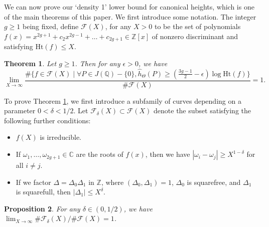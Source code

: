 \documentclass{article} %
\newtheorem{proposition}{Proposition}[section]
\newtheorem{theorem}[proposition]{Theorem}
\numberwithin{equation}{section}
\newcommand{\Q}{\mathbb{Q}}
\newcommand{\bC}{\mathbb{C}}
\newcommand{\Z}{\mathbb{Z}}
\newcommand{\height}{\mathrm{Ht}}
\begin{document}
We can now prove our `density 1' lower bound for canonical heights, which is one of the main theorems of this paper. We first introduce some notation. The integer $g \geq 1$ being fixed, define $\mathcal{F}(X)$, for any $X > 0$ to be the set of polynomials $f(x) = x^{2g+1} + c_2 x^{2g-1} + \dots + c_{2g+1} \in \Z[x]$ of nonzero discriminant and satisfying $\height(f) \leq X$. 
\begin{theorem}\label{thm_density_1_lower_bound_for_canonical_height}
    Let $g \geq 1$. Then for any $\epsilon > 0$, we have
    \[ \lim_{X \to \infty} \frac{\# \{ f \in \mathcal{F}(X) \mid \forall P \in J(\Q) - \{ 0 \}, \widehat{h}_\Theta(P) \geq ( \frac{3g-1}{2} - \epsilon ) \log \height(f) \}}{ \# \mathcal{F}(X)} = 1. \]
\end{theorem}
To prove Theorem \ref{thm_density_1_lower_bound_for_canonical_height}, we first introduce a subfamily of curves depending on a parameter $0< \delta <1/2$. Let $\mathcal{F}_\delta(X) \subset \mathcal{F}(X)$ denote the subset satisfying the following further conditions: 
\begin{itemize}
    \item $f(X)$ is irreducible.
    \item If $\omega_1, \dots, \omega_{2g+1} \in \bC$ are the roots of $f(x)$, then we have $|\omega_i - \omega_j| \geq X^{1-\delta}$ for all $i \neq j$. 
    \item If we factor $\Delta = \Delta_0 \Delta_1$ in $\Z$, where $(\Delta_0, \Delta_1) = 1$, $\Delta_0$ is squarefree, and $\Delta_1$ is squarefull, then $|\Delta_1| \leq X^\delta$.
\end{itemize}
\begin{proposition}\label{prop_good_family_has_density_1}
    For any $\delta \in (0,1/2)$, we have $\lim_{X \to \infty} \# \mathcal{F}_\delta(X) / \# \mathcal{F}(X) = 1$.
\end{proposition}
\end{document}
